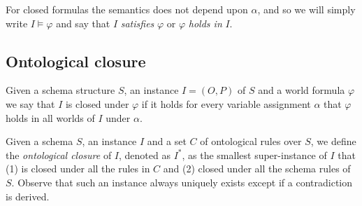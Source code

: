 \documentclass[11pt]{amsart}
\newcommand{\decl}[1]{{#1}^{\textrm{\textbf{decl}}}}
\begin{document}
For closed formulas the semantics does not depend upon $\alpha$, and so we will simply write $I \models \varphi$ and say that $I$ \emph{satisfies} $\varphi$ or $\varphi$ \emph{holds in} $I$.

%

\subsection{Ontological closure} Given a schema structure $S$, an instance $I = (O, P)$ of $S$ and a world formula $\varphi$ we say that $I$ is closed under $\varphi$ if it holds for every variable assignment $\alpha$ that $\varphi$ holds in all worlds of $I$ under $\alpha$.

Given a schema $S$, an instance $I$ and a set $C$ of ontological rules over $S$, we define the \emph{ontological closure} of $I$, denoted as $I^*$, as the smallest super-instance of $I$ that (1) is closed under all the rules in $C$ and (2) closed under all the schema rules of $S$. Observe that such an instance always uniquely exists except if a contradiction is derived.
\end{document}
